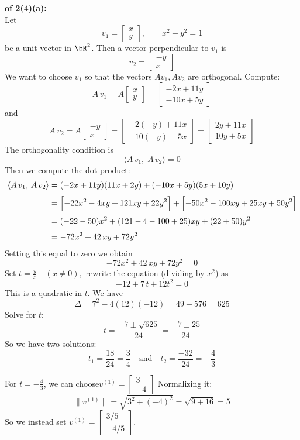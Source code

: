 \documentclass[lang=cn,11pt]{elegantbook}
\begin{document}
\begin{solution}
    \textbf{of 2(4)(a): }\\ 
Let
\[
v_1=\begin{bmatrix} x \\ y \end{bmatrix},\qquad x^2+y^2=1
\]
be a unit vector in $\bR^2$. Then a vector perpendicular to \(v_1\) is
\[
v_2=\begin{bmatrix} -y \\ x \end{bmatrix}
\]
We want to choose \(v_1\) so that the vectors $Av_1, Av_2$ are orthogonal. Compute:
\[
A\,v_1 = A\begin{bmatrix} x \\ y \end{bmatrix} =
\begin{bmatrix} -2x+11y \\ -10x+5y \end{bmatrix}
\]
and
\[
A\,v_2 = A\begin{bmatrix} -y \\ x \end{bmatrix} =
\begin{bmatrix} -2(-y)+11x \\ -10(-y)+5x \end{bmatrix} =
\begin{bmatrix} 2y+11x \\ 10y+5x \end{bmatrix}
\]
The orthogonality condition is
\[
\langle A\,v_1,\;A\,v_2\rangle=0
\]
Then we compute the dot product:
\[
\begin{aligned}
\langle A\,v_1,\, A\,v_2\rangle &= (-2x+11y)(11x+2y) + (-10x+5y)(5x+10y)\\[1mm]
&=\Bigl[-22x^2 -4xy +121xy+22y^2\Bigr] + \Bigl[-50x^2 -100xy+25xy+50y^2\Bigr]\\[1mm]
&=(-22-50)x^2 + (121-4-100+25)xy + (22+50)y^2\\[1mm]
&=-72x^2 + 42\,xy + 72y^2
\end{aligned}
\]
Setting this equal to zero we obtain
\[
-72x^2 + 42\,xy + 72y^2=0
\]
Set \(t=\frac{y}{x}\quad (x\neq0),\)  rewrite the equation (dividing by \(x^2\)) as
\[
-12+7\,t+12t^2=0
\]
This is a quadratic in \(t\). We have
\[
\Delta=7^2-4(12)(-12)=49+576=625
\]
Solve for $t$:
\[
t=\frac{-7\pm\sqrt{625}}{24}=\frac{-7\pm25}{24}
\]
So we have two solutions:
\[
t_1=\frac{18}{24}=\frac{3}{4}\quad \text{and} \quad t_2=\frac{-32}{24}=-\frac{4}{3}
\]

For \(t=-\frac{4}{3}\), we can choose\(
   v^{(1)}=\begin{bmatrix} 3 \\ -4 \end{bmatrix}
   \)  Normalizing it: 
   \[
   \|v^{(1)}\|=\sqrt{3^2+(-4)^2}=\sqrt{9+16}=5
   \]
   So we instead set $v^{(1)}=\begin{bmatrix} 3/5 \\ -4/5 \end{bmatrix}$.


\end{solution}
\end{document}
